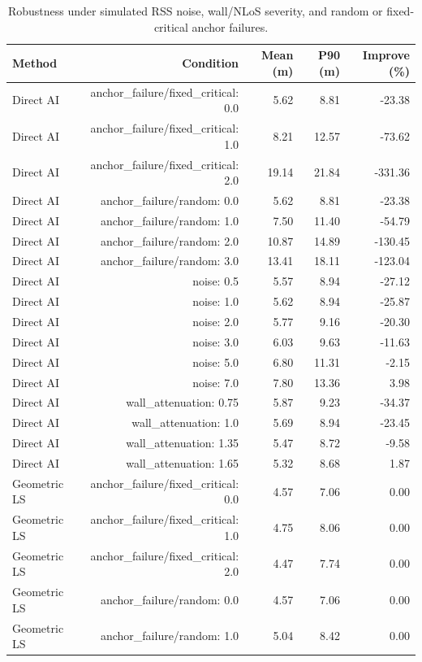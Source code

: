 \begin{table}[t]
\centering
\caption{Robustness under simulated RSS noise, wall/NLoS severity, and random or fixed-critical anchor failures.}
\label{tab:robustness}
\small
\begin{tabular}{lrrrr}
\toprule
Method & Condition & Mean (m) & P90 (m) & Improve (\%) \\
\midrule
Direct AI & anchor\_failure/fixed\_critical: 0.0 & 5.62 & 8.81 & -23.38 \\
Direct AI & anchor\_failure/fixed\_critical: 1.0 & 8.21 & 12.57 & -73.62 \\
Direct AI & anchor\_failure/fixed\_critical: 2.0 & 19.14 & 21.84 & -331.36 \\
Direct AI & anchor\_failure/random: 0.0 & 5.62 & 8.81 & -23.38 \\
Direct AI & anchor\_failure/random: 1.0 & 7.50 & 11.40 & -54.79 \\
Direct AI & anchor\_failure/random: 2.0 & 10.87 & 14.89 & -130.45 \\
Direct AI & anchor\_failure/random: 3.0 & 13.41 & 18.11 & -123.04 \\
Direct AI & noise: 0.5 & 5.57 & 8.94 & -27.12 \\
Direct AI & noise: 1.0 & 5.62 & 8.94 & -25.87 \\
Direct AI & noise: 2.0 & 5.77 & 9.16 & -20.30 \\
Direct AI & noise: 3.0 & 6.03 & 9.63 & -11.63 \\
Direct AI & noise: 5.0 & 6.80 & 11.31 & -2.15 \\
Direct AI & noise: 7.0 & 7.80 & 13.36 & 3.98 \\
Direct AI & wall\_attenuation: 0.75 & 5.87 & 9.23 & -34.37 \\
Direct AI & wall\_attenuation: 1.0 & 5.69 & 8.94 & -23.45 \\
Direct AI & wall\_attenuation: 1.35 & 5.47 & 8.72 & -9.58 \\
Direct AI & wall\_attenuation: 1.65 & 5.32 & 8.68 & 1.87 \\
Geometric LS & anchor\_failure/fixed\_critical: 0.0 & 4.57 & 7.06 & 0.00 \\
Geometric LS & anchor\_failure/fixed\_critical: 1.0 & 4.75 & 8.06 & 0.00 \\
Geometric LS & anchor\_failure/fixed\_critical: 2.0 & 4.47 & 7.74 & 0.00 \\
Geometric LS & anchor\_failure/random: 0.0 & 4.57 & 7.06 & 0.00 \\
Geometric LS & anchor\_failure/random: 1.0 & 5.04 & 8.42 & 0.00 \\

\end{tabular}
\end{table}
